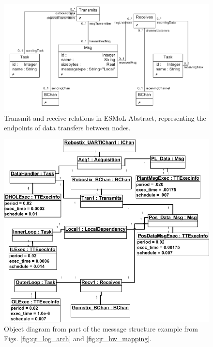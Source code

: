 \begin{figure}
\centering
\includegraphics[width=0.8\columnwidth]{figures/tran_rcv.png}
    \caption{Transmit and receive relations in ESMoL Abstract, 
representing the endpoints of data transfers between nodes.}
    \label{fig:trnrcv_meta}
\end{figure}

\begin{figure}
\centering
\includegraphics[width=0.85\columnwidth]{figures/msg_struct.png}
    \caption{Object diagram from part of the message structure example
from Figs. \ref{fig:qr_log_arch} and \ref{fig:qr_hw_mapping}. }
    \label{fig:msg_sched}
\end{figure}

